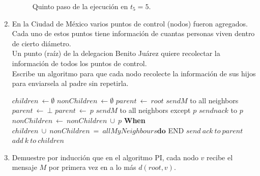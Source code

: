 \documentclass[12pt,a4paper]{report}
\begin{document}
\begin{enumerate}
{\begin{figure}[h!]
\begin{center}
					\caption{Quinto paso de la ejecución en $t_5=5$.}
				\end{center}
			\end{figure}
			\newpage
		}

		\item {
			En la Ciudad de México varios puntos de control (nodos) fueron agregados.\\
			Cada uno de estos puntos tiene información de cuantas personas viven
			dentro de cierto diámetro. \\
			Un punto (raíz) de la delegacion Benito Juárez quiere recolectar la
			información de todos los puntos de control. \\
			Escribe un algoritmo para que cada nodo recolecte la información de sus
			hijos para enviarsela al padre sin repetirla.\\

			\begin{algorithmic}[1]
				\State $children \ \leftarrow \emptyset$
				\State $nonChildren \ \leftarrow \emptyset$
					\State $parent\ \leftarrow\ root$
					\State $send M$ to all neighbors
				\Else
					\State $parent\ \leftarrow\ \bot$
				\EndIf
				\State {}
				\Start
						\State $parent\ \leftarrow\ p$
						\State $send M$ to all neighbors except $p$
					\Else
						\State $send nack$ to $p$
					\EndIf
				\End
				\State {}
				\Start
					\State $nonChildren\ \leftarrow\ nonChildren\ \cup\ {p}$
				\End
				\textbf{When} $children\ \cup\ nonChildren\ =\ allMyNeighbours
							\textbf{do}$
				\Start
						\State END
					\Else
						\State $send\ ack\ to\ parent$
					\EndIf
				\Start
					\State $add\ k\ to\ children$
				\End
				\End
			\end{algorithmic}
			}

		\item{
			Demuestre por inducción que en el algoritmo PI, cada nodo $v$ recibe el
			mensaje $M$ por primera vez en a lo más $d(root, v)$.\\

}
\end{enumerate}
\end{document}
